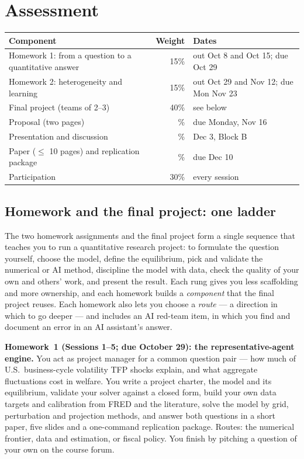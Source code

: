 \documentclass[11pt]{article}
\begin{document}
\section{Assessment}

\begin{center}
\renewcommand{\arraystretch}{1.2}
\begin{tabularx}{\linewidth}{@{}Lrl@{}}
\toprule
\textbf{Component} & \textbf{Weight} & \textbf{Dates} \\
\midrule
Homework 1: from a question to a quantitative answer & 15\% & out Oct 8 and Oct 15; due Oct 29 \\
Homework 2: heterogeneity and learning & 15\% & out Oct 29 and Nov 12; due Mon Nov 23 \\
Final project (teams of 2--3) & 40\% & see below \\
\quad Proposal (two pages) & \% & due Monday, Nov 16 \\
\quad Presentation and discussion & \% & Dec 3, Block B \\
\quad Paper ($\le$ 10 pages) and replication package & \% & due Dec 10 \\
Participation & 30\% & every session \\
\bottomrule
\end{tabularx}
\end{center}

\subsection{Homework and the final project: one ladder}
The two homework assignments and the final project form a single sequence that teaches you to run a quantitative research project: to formulate the question yourself, choose the model, define the equilibrium, pick and validate the numerical or AI method, discipline the model with data, check the quality of your own and others' work, and present the result. Each rung gives you less scaffolding and more ownership, and each homework builds a \emph{component} that the final project reuses. Each homework also lets you choose a \emph{route} --- a direction in which to go deeper --- and includes an AI red-team item, in which you find and document an error in an AI assistant's answer.

\textbf{Homework~1 (Sessions 1--5; due October 29): the representative-agent engine.} You act as project manager for a common question pair --- how much of U.S.\ business-cycle volatility TFP shocks explain, and what aggregate fluctuations cost in welfare. You write a project charter, the model and its equilibrium, validate your solver against a closed form, build your own data targets and calibration from FRED and the literature, solve the model by grid, perturbation and projection methods, and answer both questions in a short paper, five slides and a one-command replication package. Routes: the numerical frontier, data and estimation, or fiscal policy. You finish by pitching a question of your own on the course forum.
\end{document}
